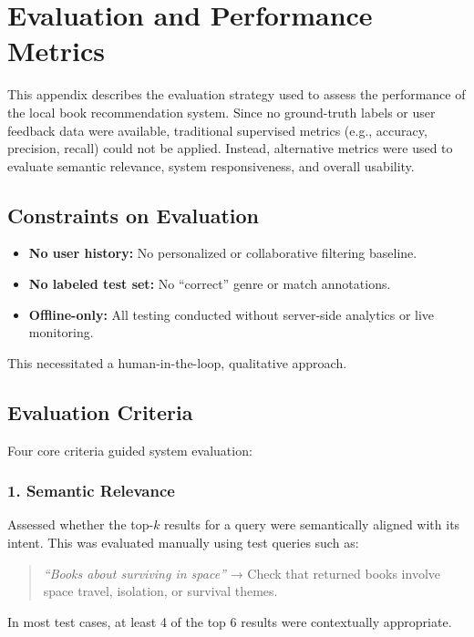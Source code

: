 \chapter{Evaluation and Performance Metrics}
\label{appendix:evaluation}

This appendix describes the evaluation strategy used to assess the performance of the local book recommendation system. Since no ground-truth labels or user feedback data were available, traditional supervised metrics (e.g., accuracy, precision, recall) could not be applied. Instead, alternative metrics were used to evaluate semantic relevance, system responsiveness, and overall usability.

\section{Constraints on Evaluation}
\begin{itemize}
    \item \textbf{No user history:} No personalized or collaborative filtering baseline.
    \item \textbf{No labeled test set:} No “correct” genre or match annotations.
    \item \textbf{Offline-only:} All testing conducted without server-side analytics or live monitoring.
\end{itemize}

This necessitated a human-in-the-loop, qualitative approach.

\section{Evaluation Criteria}
Four core criteria guided system evaluation:

\subsection*{1. Semantic Relevance}
Assessed whether the top-\( k \) results for a query were semantically aligned with its intent. This was evaluated manually using test queries such as:

\begin{quote}
\textit{“Books about surviving in space”} → Check that returned books involve space travel, isolation, or survival themes.
\end{quote}

In most test cases, at least 4 of the top 6 results were contextually appropriate.

